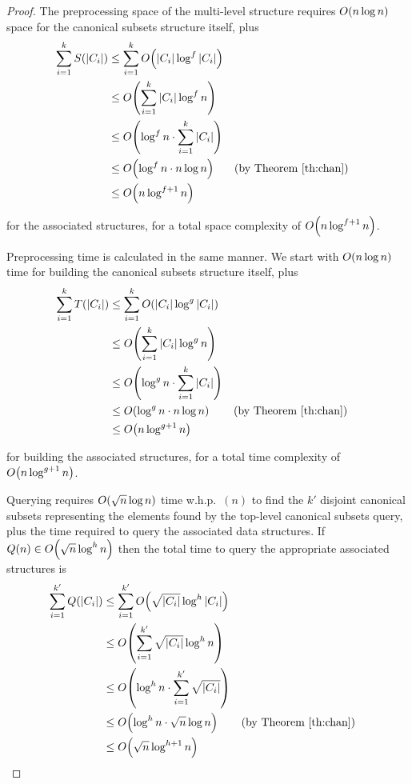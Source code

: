 \begin{proof}
The preprocessing space of the multi-level structure requires $O\!\left(n \log{n}\right)$ space for the canonical subsets structure itself, plus
\begin{align*}
\sum_{i=1}^k{S(|C_i|)}
&\leq \sum_{i=1}^k{\BigOh{|C_i| \log^f{|C_i|}}} \\
%
&\leq \BigOh{\sum_{i=1}^k{|C_i| \log^f{n}}} \\
%
&\leq \BigOh{\log^f{n} \cdot \sum_{i=1}^k{|C_i|}} \\
%
&\leq \BigOh{\log^f{n} \cdot n \log{n}} && \text{(by Theorem \ref{th:chan})}\\
%
&\leq \BigOh{n\log^{f+1}{n}} \\
\end{align*}

\noindent for the associated structures, for a total space complexity of $O\!\left(n\log^{f+1}{n}\right)$.

Preprocessing time is calculated in the same manner. 
We start with $O\!\left(n \log{n}\right)$ time for building the canonical subsets structure itself, plus
\begin{align*}
\sum_{i=1}^k{T(|C_i|)}
&\leq \sum_{i=1}^k{\BigOh{|C_i| \log^g{|C_i|}}} \\
%
&\leq \BigOh{\sum_{i=1}^k{|C_i| \log^g{n}}} \\
%
&\leq \BigOh{\log^g{n} \cdot \sum_{i=1}^k{|C_i|}} \\
%
&\leq \BigOh{\log^g{n} \cdot n \log{n}} && \text{(by Theorem \ref{th:chan})} \\
%
&\leq \BigOh{n\log^{g+1}{n}} \\
\end{align*}

\noindent for building the associated structures, for a total time complexity of $O\!\left(n\log^{g+1}{n}\right)$.

Querying requires $O\!\left(\sqrt{n}\log{n}\right)$ time w.h.p.~$(n)$ to find the $k'$ disjoint canonical subsets representing the elements found by the top-level canonical subsets query, plus the time required to query the associated data structures.  
If $Q(n) \in O\!\left(\sqrt{n}\log^h{n}\right)$ then the total time to query the appropriate associated structures is
\begin{align*}
\sum_{i=1}^{k'}{Q(|C_i|)}
&\leq \sum_{i=1}^{k'}{\BigOh{\sqrt{|C_i|}\log^h{|C_i|}}} \\
%
&\leq \BigOh{\sum_{i=1}^{k'}{\sqrt{|C_i|}\log^h{n}}} \\
%
&\leq \BigOh{\log^h{n} \cdot \sum_{i=1}^{k'}{\sqrt{|C_i|}}} \\
%
&\leq \BigOh{\log^h{n} \cdot \sqrt{n}\log{n}}  && \text{(by Theorem \ref{th:chan})} \\
%
&\leq \BigOh{\sqrt{n}\log^{h+1}{n}} \\
\end{align*}


\end{proof}
